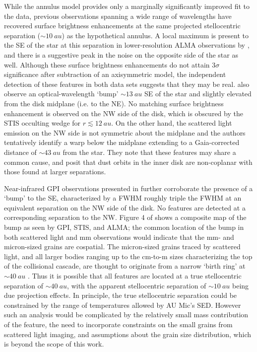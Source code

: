 \documentclass[modern]{aastex62}
\begin{document}
While the annulus model provides only a marginally significantly improved fit to the data, previous observations spanning a wide range of wavelengths have recovered surface brightness enhancements at the same projected stellocentric separation ($\sim \SI{10}{au}$) as the hypothetical annulus.
A local maximum is present to the SE of the star at this separation in lower-resolution ALMA observations by \citet{macgregor13}, and there is a suggestive peak in the noise on the opposite side of the star as well.
Although these surface brightness enhancements do not attain $3 \sigma$ significance after subtraction of an axisymmetric model, the independent detection of these features in both data sets suggests that they may be real.  
\citet{schneider14} also observe an optical-wavelength `bump' $\sim \SI{13}{au}$ SE of the star and slightly elevated from the disk midplane (i.e. to the NE).
No matching surface brightness enhancement is observed on the NW side of the disk, which is obscured by the STIS occulting wedge for $r \lesssim \SI{12}{au}$.
On the other hand, the scattered light emission on the NW side is not symmetric about the midplane and the authors tentatively identify a warp below the midplane extending to a Gaia-corrected distance of $\sim \SI{43}{au}$ from the star.
They note that these features may share a common cause, and posit that dust orbits in the inner disk are non-coplanar with those found at larger separations.

Near-infrared GPI observations presented in \citet{wang15} further corroborate the presence of a `bump' to the SE, characterized by a FWHM roughly triple the FWHM at an equivalent separation on the NW side of the disk. 
No features are detected at a corresponding separation to the NW.
Figure 4 of \citet{wang15} shows a composite map of the bump as seen by GPI, STIS, and ALMA; the common location of the bump in both scattered light and mm observations would indicate that the mm- and micron-sized grains are cospatial.
The micron-sized grains traced by scattered light, and all larger bodies ranging up to the cm-to-m sizes characterizing the top of the collisional cascade, are thought to originate from a narrow `birth ring' at $\sim \SI{40}{au}$ \citep{strubbe&chiang06}. 
Thus it is possible that all features are located at a true stellocentric separation of $\sim \SI{40}{au}$, with the apparent stellocentric separation of $\sim \SI{10}{au}$ being due projection effects.
In principle, the true stellocentric separation could be constrained by the range of temperatures allowed by AU Mic's SED. 
However such an analysis would be complicated by the relatively small mass contribution of the feature, the need to incorporate constraints on the small grains from scattered light imaging, and assumptions about the grain size distribution, which is beyond the scope of this work. 
\end{document}
